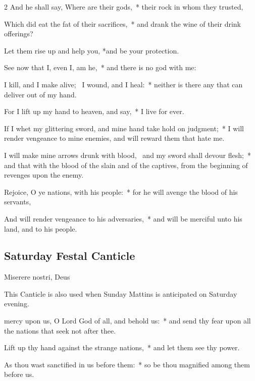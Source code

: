 \begin{multicols}{2}
And he shall say, Where are their gods,~* their rock in whom they trusted,\par
Which did eat the fat of their sacrifices,~* and drank the wine of their drink offerings?\par
Let them rise up and help you, *and be your protection.\par
See now that I, even I, am he,~* and there is no god with me:\par
I kill, and I make alive;~{\dag} I wound, and I heal:~* neither is there any that can deliver out of my hand.\par
For I lift up my hand to heaven, and say,~* I live for ever.\par
If I whet my glittering sword, and mine hand take hold on judgment;~* I will render vengeance to mine enemies, and will reward them that hate me.\par
I will make mine arrows drunk with blood,~{\dag} and my sword shall devour flesh;~* and that with the blood of the slain and of the captives, from the beginning of revenges upon the enemy.\par
Rejoice, O ye nations, with his people:~* for he will avenge the blood of his servants,\par
And will render vengeance to his adversaries,~* and will be merciful unto his land, and to his people.

\newcolumn

\subsection{Saturday Festal Canticle}

\begin{inhead}
Miserere nostri, Deus
\end{inhead}

\begin{rubric}
    This Canticle is also used when Sunday Mattins is anticipated on Saturday evening.
\end{rubric}

 mercy upon us, O Lord God of all, and behold us:~* and send thy fear upon all the nations that seek not after thee.\par

Lift up thy hand against the strange nations,~* and let them see thy power.


As thou wast sanctified in us before them:~* so be thou magnified among them before us.


\end{multicols}
